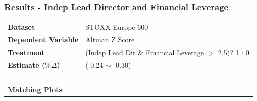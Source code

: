 \documentclass{beamer}
\begin{document}
\begin{frame}[t]
\frametitle{Results -  Indep Lead Director and Financial Leverage}
\begin{tabular}{ll}
{\bf Dataset} & STOXX Europe 600  \\
{\bf Dependent Variable} & Altman Z Score  \\
{\bf Treatment} & \footnotesize{(Indep Lead Dir \& Financial Leverage $>$ 2.5)? 1 : 0 } \\
{\bf Estimate ($\% \Delta $)} & (-0.24 $\sim$ -0.30)  \\~\\
{\bf Matching Plots} &
\end{tabular}
\vspace{-0.8cm}
\begin{figure}[h!]
\centering
\footnotesize{}
\footnotesize{ }
\footnotesize{ }
\end{figure}
\end{frame}
\end{document}
